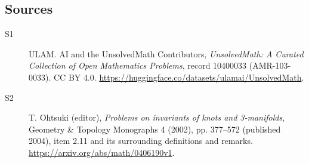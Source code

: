 \documentclass[11pt]{article}
\begin{document}
\subsection{Sources}
\begin{description}
\item[\hypertarget{source:10400033:1}{S1}] ULAM. AI and the UnsolvedMath Contributors, \emph{UnsolvedMath: A Curated Collection of Open Mathematics Problems}, record 10400033 (AMR-103-0033). CC BY 4.0. \url{https://huggingface.co/datasets/ulamai/UnsolvedMath}.
\item[\hypertarget{source:10400033:2}{S2}] T. Ohtsuki (editor), \emph{Problems on invariants of knots and 3-manifolds}, Geometry \& Topology Monographs 4 (2002), pp. 377--572 (published 2004), item 2.11 and its surrounding definitions and remarks. \url{https://arxiv.org/abs/math/0406190v1}.
\end{description}
\label{end:10400033}
\end{document}
